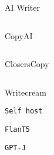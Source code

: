              
             
              \protect\hypertarget{ID_1834407737}{}{}

\begin{verbatim}
\end{verbatim}

              AI Writer
             

             
             
              \protect\hypertarget{ID_534990165}{}{}

\begin{verbatim}
\end{verbatim}

              CopyAI
             

             
             
              \protect\hypertarget{ID_1366130024}{}{}

\begin{verbatim}
\end{verbatim}

              ClosersCopy
             

             
             
              \protect\hypertarget{ID_404028568}{}{}

\begin{verbatim}
\end{verbatim}

              Writecream
             
           

           
           
            \protect\hypertarget{ID_1524926727}{}{}

\begin{verbatim}
Self host
\end{verbatim}

             
             
              \protect\hypertarget{ID_349884911}{}{}

\begin{verbatim}
FlanT5
\end{verbatim}
             

             
             
              \protect\hypertarget{ID_174326062}{}{}

\begin{verbatim}
GPT-J
\end{verbatim}
             

